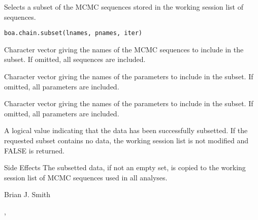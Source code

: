 \begin{Description}\relax
Selects a subset of the MCMC sequences stored in the working session list
of sequences.
\end{Description}
\begin{Usage}
\begin{verbatim}
boa.chain.subset(lnames, pnames, iter)
\end{verbatim}
\end{Usage}
\begin{Arguments}
\begin{ldescription}
\item[\code{lnames}] Character vector giving the names of the MCMC sequences to
include in the subset. If omitted, all sequences are included.
\item[\code{pnames}] Character vector giving the names of the parameters to include
in the subset. If omitted, all parameters are included.
\item[\code{iter}] Character vector giving the names of the parameters to include
in the subset. If omitted, all parameters are included.
\end{ldescription}
\end{Arguments}
\begin{Value}
A logical value indicating that the data has been successfully subsetted. If
the requested subset contains no data, the working session list is not
modified and FALSE is returned.
\end{Value}
\begin{Section}{Side Effects}
The subsetted data, if not an empty set, is copied to the working session
list of MCMC sequences used in all analyses.
\end{Section}
\begin{Author}\relax
Brian J. Smith
\end{Author}
\begin{SeeAlso}\relax
{}, 
\end{SeeAlso}

